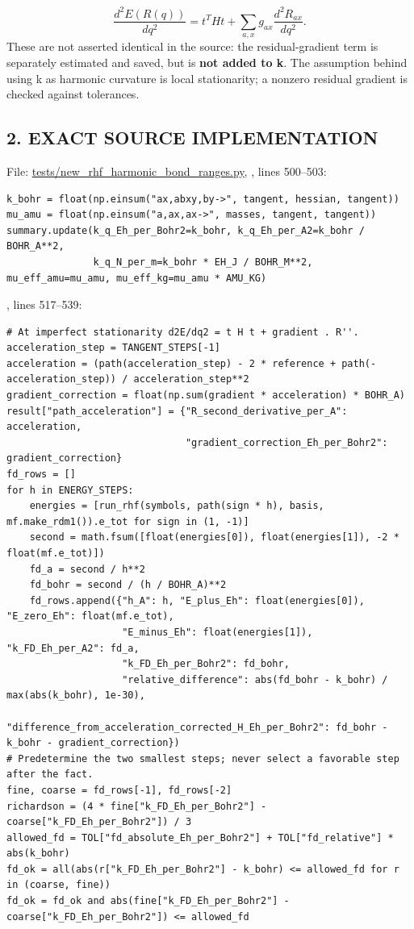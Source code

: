 \documentclass[10pt,a4paper]{article}
\begin{document}
\[
\frac{d^2E(R(q))}{dq^2}=t^THt+\sum_{a,x}g_{ax}\frac{d^2R_{ax}}{dq^2}.
\]
These are not asserted identical in the source: the residual-gradient term is separately estimated and saved, but is \textbf{not added to k}. The assumption behind using k as harmonic curvature is local stationarity; a nonzero residual gradient is checked against tolerances.

\subsection{2. EXACT SOURCE IMPLEMENTATION}
File: \href{/Users/novaz/Desktop/qml2.0/tests/new\_rhf\_harmonic\_bond\_ranges.py:500}{tests/new\_rhf\_harmonic\_bond\_ranges.py}, , lines 500–503:

\begin{Verbatim}
k_bohr = float(np.einsum("ax,abxy,by->", tangent, hessian, tangent))
mu_amu = float(np.einsum("a,ax,ax->", masses, tangent, tangent))
summary.update(k_q_Eh_per_Bohr2=k_bohr, k_q_Eh_per_A2=k_bohr / BOHR_A**2,
               k_q_N_per_m=k_bohr * EH_J / BOHR_M**2, mu_eff_amu=mu_amu, mu_eff_kg=mu_amu * AMU_KG)
\end{Verbatim}
, lines 517–539:

\begin{Verbatim}
# At imperfect stationarity d2E/dq2 = t H t + gradient . R''.
acceleration_step = TANGENT_STEPS[-1]
acceleration = (path(acceleration_step) - 2 * reference + path(-acceleration_step)) / acceleration_step**2
gradient_correction = float(np.sum(gradient * acceleration) * BOHR_A)
result["path_acceleration"] = {"R_second_derivative_per_A": acceleration,
                               "gradient_correction_Eh_per_Bohr2": gradient_correction}
fd_rows = []
for h in ENERGY_STEPS:
    energies = [run_rhf(symbols, path(sign * h), basis, mf.make_rdm1()).e_tot for sign in (1, -1)]
    second = math.fsum([float(energies[0]), float(energies[1]), -2 * float(mf.e_tot)])
    fd_a = second / h**2
    fd_bohr = second / (h / BOHR_A)**2
    fd_rows.append({"h_A": h, "E_plus_Eh": float(energies[0]), "E_zero_Eh": float(mf.e_tot),
                    "E_minus_Eh": float(energies[1]), "k_FD_Eh_per_A2": fd_a,
                    "k_FD_Eh_per_Bohr2": fd_bohr,
                    "relative_difference": abs(fd_bohr - k_bohr) / max(abs(k_bohr), 1e-30),
                    "difference_from_acceleration_corrected_H_Eh_per_Bohr2": fd_bohr - k_bohr - gradient_correction})
# Predetermine the two smallest steps; never select a favorable step after the fact.
fine, coarse = fd_rows[-1], fd_rows[-2]
richardson = (4 * fine["k_FD_Eh_per_Bohr2"] - coarse["k_FD_Eh_per_Bohr2"]) / 3
allowed_fd = TOL["fd_absolute_Eh_per_Bohr2"] + TOL["fd_relative"] * abs(k_bohr)
fd_ok = all(abs(r["k_FD_Eh_per_Bohr2"] - k_bohr) <= allowed_fd for r in (coarse, fine))
fd_ok = fd_ok and abs(fine["k_FD_Eh_per_Bohr2"] - coarse["k_FD_Eh_per_Bohr2"]) <= allowed_fd
\end{Verbatim}
\end{document}

